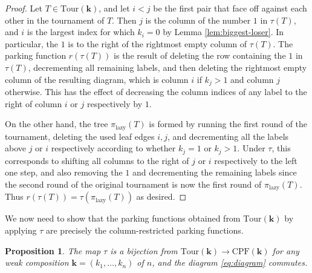 \documentclass[11pt]{amsart}
\newcommand{\CPF}{\mathrm{CPF}}
\newcommand{\Tour}{\mathrm{Tour}}
\newcommand{\forget}{\pi_{\mathrm{lazy}}}
\newtheorem{prop}[thm]{Proposition}
\numberwithin{thm}{section}
\numberwithin{equation}{section}
\numberwithin{figure}{section}
\theoremstyle{definition}
\begin{document}
\begin{proof}

  Let $T\in \Tour(\mathbf{k})$, and let $i<j$ be the first pair that face off against each other in the tournament of $T$. Then $j$ is the column of the number $1$ in $\tau(T)$, and $i$ is the largest index for which $k_i=0$ by Lemma \ref{lem:biggest-loser}.  In particular, the $1$ is to the right of the rightmost empty column of $\tau(T)$.   The parking function $r(\tau(T))$ is the result of deleting the row containing the $1$ in $\tau(T)$, decrementing all remaining labels, and then deleting the rightmost empty column of the resulting diagram, which is column $i$ if $k_j>1$ and column $j$ otherwise.  This has the effect of decreasing the column indices of any label to the right of column $i$ or $j$ respectively by $1$.
  
  
  On the other hand, the tree $\forget(T)$ is formed by running the first round of the tournament, deleting the used leaf edges $i,j$, and decrementing all the labels above $j$ or $i$ respectively according to whether $k_j=1$ or $k_j>1$.  Under $\tau$, this corresponds to shifting all columns to the right of $j$ or $i$ respectively to the left one step, and also removing the $1$ and decrementing the remaining labels since the second round of the original tournament is now the first round of $\forget(T)$.  Thus $r(\tau(T))=\tau(\forget(T))$ as desired.
\end{proof}

We now need to show that the parking functions obtained from $\Tour(\mathbf{k})$ by applying $\tau$ are precisely the column-restricted parking functions.


\begin{prop} \label{prop:bij-tour-cpf}
The map $\tau$ is a bijection from $\Tour(\mathbf{k})\to \CPF(\mathbf{k})$ for any weak composition $\mathbf{k}=(k_1,\ldots,k_n)$ of $n$, and the diagram \eqref{eq:diagram} commutes.
\end{prop}
\end{document}
